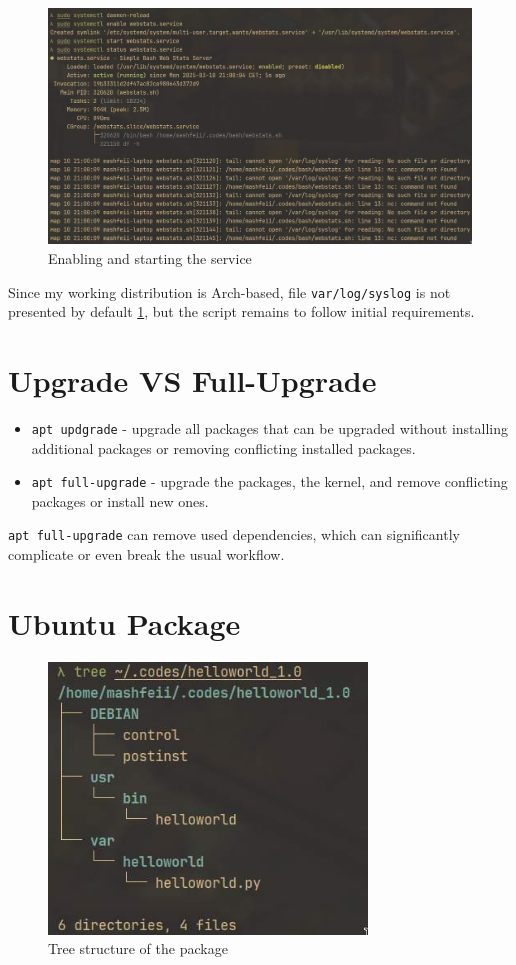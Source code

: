 \documentclass{article}
\newcommand{\code}[1]{\colorbox{light-gray}{\texttt{#1}}}
\begin{document}
\begin{figure}[H]
	\centering
	\includegraphics[width=460pt]{7_5-3.jpg}
	\caption{Enabling and starting the service\label{fig:7_5-3}}
\end{figure}

Since my working distribution is Arch-based, file \code{var/log/syslog} is not presented by default \ref{fig:7_5-3}, but the script remains to follow initial requirements.

\newpage
\section{Upgrade VS Full-Upgrade}
\noindent

\begin{itemize}
	\item \code{apt updgrade} - upgrade all packages that can be upgraded without installing additional packages or removing conflicting installed packages.
	\item \code{apt full-upgrade} - upgrade the packages, the kernel, and remove conflicting packages or install new ones.
\end{itemize}

\code{apt full-upgrade} can remove used dependencies, which can significantly complicate or even break the usual workflow.

\section{Ubuntu Package}
\noindent

\begin{figure}[H]
  \centering
  \includegraphics[width=240pt]{8_2.jpg}
  \caption{Tree structure of the package}
\end{figure}
\end{document}
